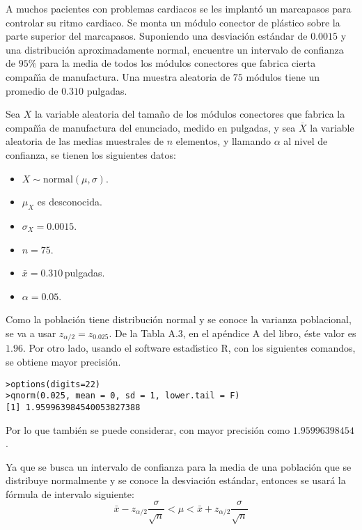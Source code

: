 \begin{enunciado}
 A muchos pacientes con problemas cardiacos se les implant\'o un marcapasos para controlar su ritmo cardiaco. Se monta un m\'odulo conector de pl\'astico sobre la parte superior del marcapasos. Suponiendo una desviaci\'on est\'andar de $0.0015$ y una distribuci\'on aproximadamente normal, encuentre un intervalo de confianza de $95\%$ para la media de todos los m\'odulos conectores que fabrica cierta compa\~n\'{\i}a de manufactura. Una muestra aleatoria de $75$ m\'odulos tiene un promedio de $0.310$ pulgadas.
\end{enunciado}

\begin{solucion}
 Sea $X$ la variable aleatoria del tama\~no de los m\'odulos conectores que fabrica la compa\~n\'{\i}a de manufactura del enunciado, medido en pulgadas, y sea $\overline{X}$ la variable aleatoria de las medias muestrales de $n$ elementos, y llamando $\alpha$ al nivel de confianza, se tienen los siguientes datos:
 \begin{itemize}
  \item $X\sim\text{normal}(\mu, \sigma)$.
  \item $\mu_X$ es desconocida.
  \item $\sigma_X = 0.0015$.
  \item $n=75$.
  \item $\bar{x} = 0.310\,$pulgadas.
  \item $\alpha=0.05$.
 \end{itemize}
 Como la poblaci\'on tiene distribuci\'on normal y se conoce la varianza poblacional, se va a usar $z_{\alpha/2} = z_{0.025}$. De la Tabla A.3, en el ap\'endice A del libro, \'este valor es $1.96$. Por otro lado, usando el software estad\'{\i}stico R, con los siguientes comandos, se obtiene mayor precisi\'on.
 \begin{verbatim}
>options(digits=22)
>qnorm(0.025, mean = 0, sd = 1, lower.tail = F)
[1] 1.959963984540053827388
 \end{verbatim}
 \vspace{-0.5cm}
 Por lo que tambi\'en se puede considerar, con mayor precisi\'on como $1.95996398454$.
 \par 
 Ya que se busca un intervalo de confianza para la media de una poblaci\'on que se distribuye normalmente y se conoce la desviaci\'on est\'andar, entonces se usar\'a la f\'ormula de intervalo siguiente:
 \begin{equation*}
  \bar{x} - z_{\alpha/2}\frac{\sigma}{\sqrt{n}} < \mu < \bar{x} + z_{\alpha/2}\frac{\sigma}{\sqrt{n}}

\end{equation*}
\end{solucion}
